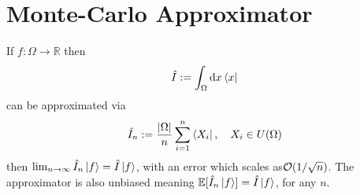 \documentclass[a4paper,12pt]{article}
\newcommand{\opr}[1]{\hat{#1}}
\theoremstyle{theorem}
\theoremstyle{Def}
\theoremstyle{Def}
\theoremstyle{corollary}
\theoremstyle{lemma}
\theoremstyle{remark}
\begin{document}
\section{Monte-Carlo Approximator}
If $f: \Omega \to \mathbb R$ then
\begin{align*}
    \opr I := \int_\Omega\dd x\bra x
\end{align*}
can be approximated via
\begin{align*}
    \opr I_n := \frac{|\Omega|}{n}\sum_{i=1}^n\bra{X_i}\qc X_i \in U(\Omega)
\end{align*}
then $\lim_{n\to\infty}\opr I_n \ket f = \opr I\ket f$, with an error which scales as$\order{1/\sqrt n}$. The approximator is also unbiased meaning $\mathbb E [\opr I_n\ket f] = \opr I\ket f$, for any $n$.
\end{document}
